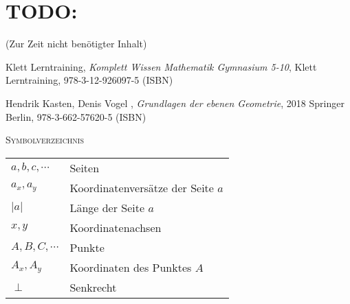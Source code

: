 \documentclass[a4paper]{amsart}
\theoremstyle{definition}
\begin{document}
\section{TODO:}
\begin{backup}
    (Zur Zeit nicht benötigter Inhalt)
\end{backup}

\begin{thebibliography}{9}

      Klett Lerntraining, \emph{Komplett Wissen Mathematik Gymnasium 5-10},
      Klett Lerntraining, 978-3-12-926097-5 (ISBN)
      
       Hendrik Kasten, Denis Vogel , \emph{Grundlagen der ebenen Geometrie},
      2018 Springer Berlin, 978-3-662-57620-5 (ISBN)

\end{thebibliography}

\begin{large}
    \centerline{\textsc{Symbolverzeichnis}}
\end{large}
\bigskip

\renewcommand*{\arraystretch}{1}

\begin{tabular}{ll}
    $a,b,c, \cdots$               &Seiten\\
    $a_x,a_y$                   &Koordinatenversätze der Seite $a$\\
    $|a|$                       &Länge der Seite $a$\\
    $x, y$                      &Koordinatenachsen\\
    $A, B, C, \cdots$          &Punkte\\
    $A_x, A_y$                 &Koordinaten des Punktes $A$\\
    $\perp$                    &Senkrecht
\end{tabular}
\end{document}
